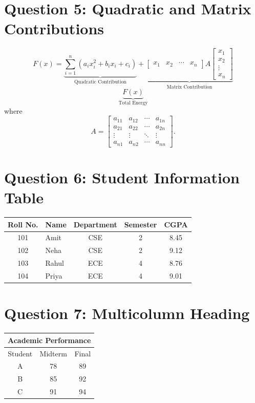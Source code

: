 \documentclass[11pt,a4paper]{article}
\begin{document}
\section*{Question 5: Quadratic and Matrix Contributions}
\[
F(x)=
\underbrace{
\sum_{i=1}^{n}(a_i x_i^2+b_i x_i+c_i)
}_{\text{Quadratic Contribution}}
+
\underbrace{
\begin{bmatrix}x_1&x_2&\cdots&x_n\end{bmatrix}
A
\begin{bmatrix}
x_1\\x_2\\\vdots\\x_n
\end{bmatrix}
}_{\text{Matrix Contribution}}
\]
\[
\underbrace{F(x)}_{\text{Total Energy}}
\]
where
\[
A=
\begin{bmatrix}
a_{11}&a_{12}&\cdots&a_{1n}\\
a_{21}&a_{22}&\cdots&a_{2n}\\
\vdots&\vdots&\ddots&\vdots\\
a_{n1}&a_{n2}&\cdots&a_{nn}
\end{bmatrix}.
\]

\section*{Question 6: Student Information Table}
\begin{center}
\begin{tabular}{|c|l|c|c|c|}
\hline
\textbf{Roll No.}&\textbf{Name}&\textbf{Department}&
\textbf{Semester}&\textbf{CGPA}\\ \hline
101&Amit&CSE&2&8.45\\
102&Neha&CSE&2&9.12\\
103&Rahul&ECE&4&8.76\\
104&Priya&ECE&4&9.01\\ \hline
\end{tabular}
\end{center}

\section*{Question 7: Multicolumn Heading}
\begin{center}
\begin{tabular}{|c|c|c|}
\hline
\multicolumn{3}{|c|}{\textbf{Academic Performance}}\\ \hline
Student&Midterm&Final\\ \hline
A&78&89\\
B&85&92\\
C&91&94\\ \hline
\end{tabular}
\end{center}
\end{document}
